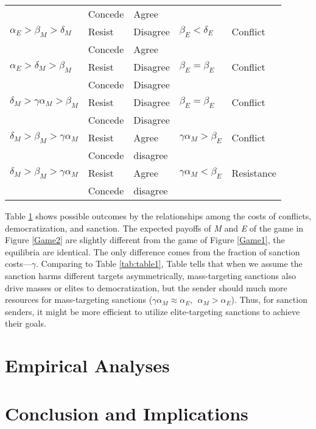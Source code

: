 \documentclass[11pt]{article}
\begin{document}
\begin{table}[!ht]
\begin{tabular}{ p{3cm} p{2cm} p{2cm} p{3cm} p{3cm} }
                                          & Concede  & Agree    &                           &                \\
    $\alpha_{E} > \beta_{M} > \delta_{M}$	& Resist   & Disagree & $\beta_{E} < \delta_{E}$  & Conflict     \\
                                          & Concede  & Agree    &                           &                \\
		$\alpha_{E} > \delta_{M} > \beta_{M}$	& Resist   & Disagree  & $\beta_{E} = \beta_{E}$   & Conflict \\
	     	                                  & Concede  & Disagree &                           &                \\
		$\delta_{M} > \gamma\alpha_{M} > \beta_{M}$ & Resist   & Disagree & $\beta_{E} = \beta_{E}$   & Conflict \\
	                                        & Concede  & Disagree &                           &                \\
		$\delta_{M} > \beta_{M} > \gamma\alpha_{M}$	& Resist   & Agree    & $\gamma\alpha_{M} > \beta_{E}$  & Conflict  \\
		                                      & Concede  & disagree &                           &                \\
    $\delta_{M} > \beta_{M} > \gamma\alpha_{M}$	& Resist   & Agree    & $\gamma\alpha_{M} < \beta_{E}$  & Resistance\\
		                                            & Concede  & disagree &                                &      \\
		\bottomrule
	\end{tabular}
	{\raggedright }
	\label{tab:table2}
\end{table}

Table \ref{tab:table2} shows possible outcomes by the relationships among the costs of conflicts, democratization, and sanction. The expected payoffs of \textit{M} and \textit{E} of the game in Figure \ref{Game2} are slightly different from the game of Figure \ref{Game1}, the equilibria are identical. The only difference comes from the fraction of sanction costs---$\gamma$. Comparing to Table \ref{tab:table1}, Table  tells that when we assume the sanction harms different targets asymmetrically, mass-targeting sanctions also drive masses or elites to democratization, but the sender should much more resources for mass-targeting sanctions ($\gamma\alpha_{M} \approx \alpha_{E}, \:\:\alpha_{M} > \alpha_{E}$). Thus, for sanction senders, it might be more efficient to utilize elite-targeting sanctions to achieve their goals.






\section*{Empirical Analyses}

\section*{Conclusion and Implications}



	
\end{document}
